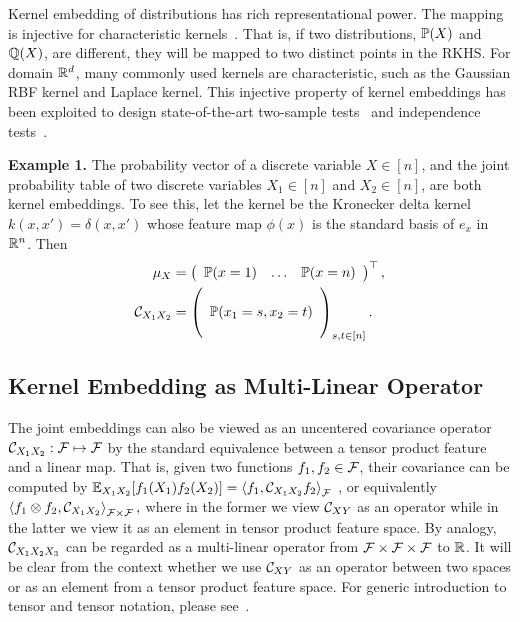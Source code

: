 \documentclass{article}
\begin{document}
Kernel embedding of distributions has rich representational power. The mapping is injective for characteristic kernels~\cite{SriGreFukLanetal08}. That is, if two distributions, $\mathbb{P}(X)$ and $\mathbb{Q}(X)$, are different, they will be mapped to two distinct points in the RKHS. For domain $\mathbb{R}^d$, many commonly used kernels are characteristic, such as the Gaussian RBF kernel and Laplace kernel.
This injective property of kernel embeddings has been exploited to design  state-of-the-art two-sample tests~\cite{GreBorRasSchetal12} and  independence tests~\cite{GreFukTeoSonetal08}.

{\bf Example 1.} The probability vector of a discrete variable $X \in [n]$, and the joint probability table of two discrete variables $X_1 \in [n]$ and $X_2 \in [n]$, are both kernel embeddings. To see this, let the kernel be the Kronecker delta kernel $k(x,x') = \delta(x,x')$ whose feature map $\phi(x)$ is the standard basis of $e_{x}$ in $\mathbb{R}^n$. Then
\begin{align}
    \mu_X
		& = \left(
      \begin{array}{ccc}
         \mathbb{P}(x = 1) &
         \hdots &
         \mathbb{P}(x = n)
       \end{array}
    \right)^\top, \nonumber \\
		\mathcal{C}_{X_1X_2}
		&=
		\left(
        \begin{array}{c}
            \cr
            \mathbb{P}(x_1=s,x_2=t) \cr
						\cr
        \end{array}
    \right)_{s,t \in [n]}. \nonumber
\end{align}

\subsection{Kernel Embedding as Multi-Linear Operator}

The joint embeddings can also be viewed as an uncentered covariance operator $\mathcal{C}_{X_1X_2}:\mathcal{F}\mapsto \mathcal{F}$ by the standard equivalence between a tensor product feature and a linear map.
That is, given two functions $f_1,f_2\in\mathcal{F}$, their covariance can be computed by
$
    \mathbb{E}_{X_1X_2}[f_1(X_1)f_2(X_2)]=\left\langle f_1,\mathcal{C}_{X_1X_2} f_2 \right\rangle_{\mathcal{F}}
$
, or equivalently
$
\left\langle f_1\otimes f_2,\mathcal{C}_{X_1X_2} \right\rangle_{\mathcal{F}\times\mathcal{F}},
$
where in the former we view $\mathcal{C}_{XY}$ as an operator while in the latter we view it as an element in tensor product feature space.
By analogy, $\mathcal{C}_{X_1X_2X_3}$ can be regarded as a multi-linear operator from $\mathcal{F}\times\mathcal{F}\times\mathcal{F}$ to $\mathbb{R}$.
It will be clear from the context whether we use $\mathcal{C}_{XY}$ as an operator between two spaces or as an element from a tensor product feature space. For generic introduction to tensor and tensor notation, please see~\cite{KolBad09}.
\end{document}
